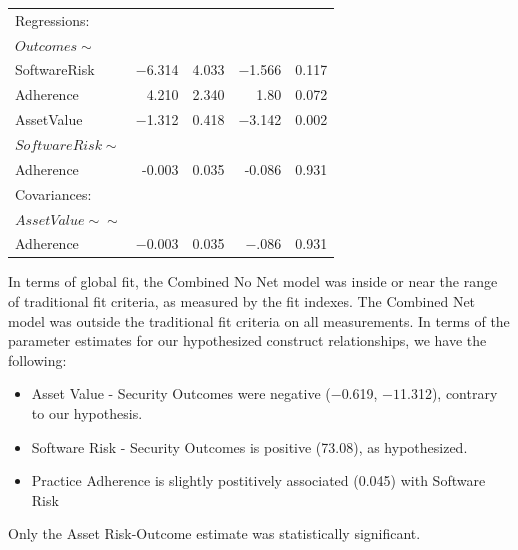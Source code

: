 \begin{table}
\begin{center}
\begin{tabular}{l|rrrr}
			Regressions:  & & & & \\  
			$Outcomes \sim$         & & & & \\                                     
			SoftwareRisk   &  $-$6.314 &   4.033 & $-$1.566 &   0.117 \\
			Adherence       &  4.210  & 2.340  &  1.80  &  0.072\\
			AssetValue     &   $-$1.312  &  0.418  &  $-$3.142 &   0.002\\
			$SoftwareRisk \sim$        & & & & \\                                  
			Adherence     &    -0.003 &   0.035  &  -0.086 &   0.931\\
			Covariances:  & & & & \\  
			$AssetValue \sim\sim$          & & & & \\                                 
			Adherence     &    $-$0.003 &   0.035  &  $-$.086 &   0.931\\
		\end{tabular}
	\end{center}
\end{table}

In terms of global fit, the Combined No Net model was inside or near the range of traditional fit criteria, as measured by the fit indexes. The Combined Net model was outside the traditional fit criteria on all measurements. In terms of the parameter estimates for our hypothesized  construct relationships, we have the following:
\begin{itemize}
	\item  Asset Value - Security Outcomes were negative ($-$0.619, $-1$1.312), contrary to our hypothesis. 
	\item Software Risk - Security Outcomes is positive (73.08), as hypothesized. 
	\item Practice Adherence is slightly postitively associated (0.045) with Software Risk 
\end{itemize}	
Only the Asset Risk-Outcome estimate was statistically significant.
